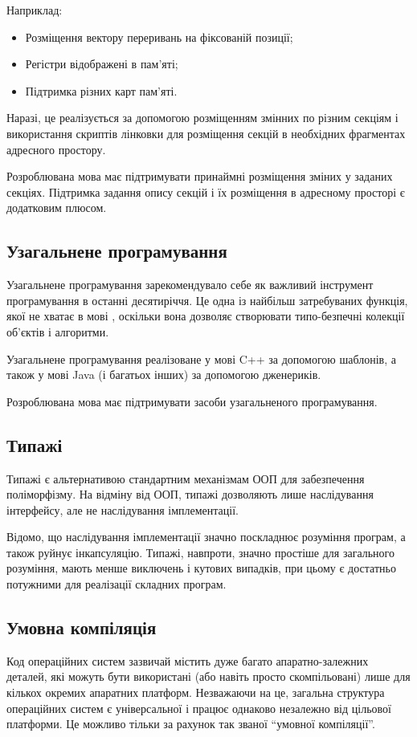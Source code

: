 \documentclass[main.tex]{subfiles}
\begin{document}
Наприклад:
\begin{itemize}[nosep]
\item Розміщення вектору переривань на фіксованій позиції;
\item Регістри відображені в пам'яті;
\item Підтримка різних карт пам'яті.
\end{itemize}

Наразі, це реалізується за допомогою розміщенням змінних по різним секціям і використання скриптів лінковки для розміщення секцій в необхідних фрагментах адресного простору.

Розроблювана мова має підтримувати принаймні розміщення зміних у заданих секціях. Підтримка задання опису секцій і їх розміщення в адресному просторі є додатковим плюсом.

\subsection{Узагальнене програмування}
Узагальнене програмування зарекомендувало себе як важливий інструмент програмування в останні десятиріччя. Це одна із найбільш затребуваних функція, якої не хватає в мові \LangC{}, оскільки вона дозволяє створювати типо-безпечні колекції об'єктів і алгоритми.

Узагальнене програмування реалізоване у мові C++ за допомогою шаблонів, а також у мові Java (і багатьох інших) за допомогою дженериків.

Розроблювана мова має підтримувати засоби узагальненого програмування.

\subsection{Типажі}
Типажі є альтернативою стандартним механізмам ООП для забезпечення поліморфізму. На відміну від ООП, типажі дозволяють лише наслідування інтерфейсу, але не наслідування імплементації.

Відомо, що наслідування імплементації значно поскладнює розуміння програм, а також руйнує інкапсуляцію\cite{oop-must-die}.
Типажі, навпроти, значно простіше для загального розуміння, мають менше виключень і кутових випадків, при цьому є достатньо потужними для реалізації складних програм.

\subsection{Умовна компіляція}
Код операційних систем зазвичай містить дуже багато апаратно-залежних деталей, які можуть бути використані (або навіть просто скомпільовані) лише для кількох окремих апаратних платформ.
Незважаючи на це, загальна структура операційних систем є універсальної і працює однаково незалежно від цільової платформи.
Це можливо тільки за рахунок так званої ``умовної компіляції''.
\end{document}
